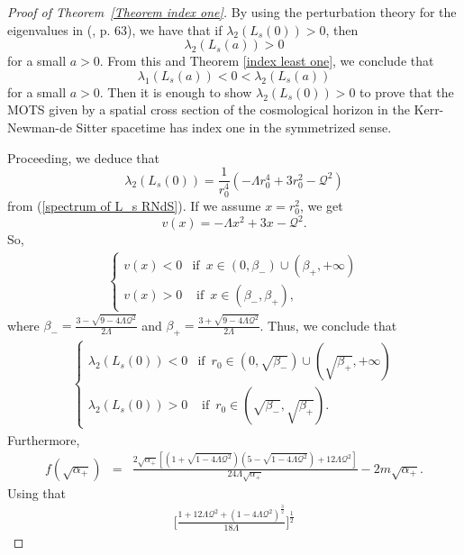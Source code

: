 \documentclass[a4paper, 11pt, reqno]{amsart}
\begin{document}
\begin{proof}[Proof of Theorem~\ref{Theorem index one}]
By using the perturbation theory for the eigenvalues in (\cite{K}, p. 63), we have that if $\lambda_2(L_s(0))>0$, then
$$\lambda_2(L_s(a))>0$$
for a small $a>0$. From this and Theorem \ref{index least one}, we conclude that
$$\lambda_1(L_s(a))<0<\lambda_2(L_s(a))$$
for a small $a>0$. Then it is enough to show $\lambda_2(L_s(0))>0$ to prove that the MOTS given by a spatial cross section of the cosmological horizon in the Kerr-Newman-de Sitter spacetime has index one in the symmetrized sense.

Proceeding, we deduce that
 \begin{equation*}
     \lambda_2(L_s(0))=\frac{1}{r_0^4}(-\Lambda r_0^4+3r_0^2-\mathcal{Q}^2)
 \end{equation*}
from (\ref{spectrum of L_s RNdS}). If we assume $x=r_0^2$, we get
\begin{equation*}
    v(x)=-\Lambda x^2+3x-\mathcal{Q}^2.
\end{equation*}
So,
\begin{eqnarray*}
\left\{\begin{array}{rc}
v(x)<0 &\mbox{if}\,\,\,x\in (0,\beta_{-})\cup(\beta_{+},+\infty)\\
v(x)>0  &\mbox{ if}\,\,\,x\in (\beta_{-},\beta_{+}),
\end{array}\right.
\end{eqnarray*}
where $\beta_{-}=\frac{3-\sqrt{9-4\Lambda\mathcal{Q}^2}}{2\Lambda}$ and $\beta_{+}=\frac{3+\sqrt{9-4\Lambda\mathcal{Q}^2}}{2\Lambda}$. Thus, we conclude that
 \begin{eqnarray*}
\left\{\begin{array}{rc}
\lambda_2(L_s(0))<0 &\mbox{if}\,\,\,r_0\in (0,\sqrt{\beta_{-}})\cup(\sqrt{\beta_{+}},+\infty)\\
\lambda_{2}(L_s(0))>0  &\mbox{ if}\,\,\,r_0\in (\sqrt{\beta_{-}},\sqrt{\beta_{+}}).
\end{array}\right.
\end{eqnarray*}
Furthermore,
 \begin{eqnarray*}
f(\sqrt{\alpha_{+}})
&=&\frac{2\sqrt{\alpha_{+}}[(1+\sqrt{1-4\Lambda\mathcal{Q}^2})(5-\sqrt{1-4\Lambda\mathcal{Q}^2})+12\Lambda\mathcal{Q}^2]}{24\Lambda\sqrt{\alpha_{+}}}
-2m\sqrt{\alpha_{+}}.
\end{eqnarray*}
Using that
\begin{eqnarray}\label{first equality}
    \Bigg[\frac{1+12\Lambda\mathcal{Q}^2+(1-4\Lambda\mathcal{Q}^2)^{\frac{3}{2}}}{18\Lambda}\Bigg]^{\frac{1}{2}}

\end{eqnarray}
\end{proof}
\end{document}
